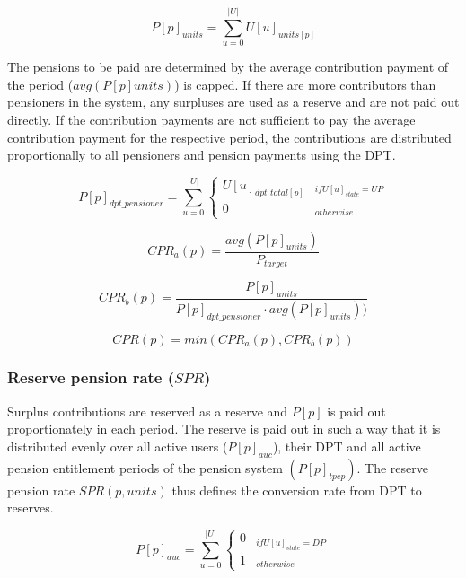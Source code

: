 \begin{equation}
P[p]_{units} = \sum_{u=0}^{|U|} U[u]_{units[p]}
\end{equation}

The pensions to be paid are determined by the average contribution payment of the 
period ($avg(P[p]units)$) is capped. If there are more contributors than pensioners in the system, any surpluses are used as a reserve and are not paid out directly. If the contribution payments are not sufficient to pay the average contribution payment for the respective period, the contributions are distributed proportionally to all pensioners and pension payments using the DPT.

\begin{dmath}
P[p]_{dpt\_pensioner} = 
\sum_{u=0}^{|U|} \begin{cases} 
U[u]_{dpt\_total[p]} & _{if U[u]_{state} = UP}\\
0 & _{otherwise}
\end{cases}
\end{dmath}

\begin{equation*}
CPR_{a}(p) = \frac{avg(P[p]_{units})}{P_{target}}
\end{equation*}

\begin{equation*}
CPR_{b}(p) = \frac{P[p]_{units}} {P[p]_{dpt\_pensioner} \cdot avg(P[p]_{units}))}
\end{equation*}

\begin{equation}
CPR(p) = min(CPR_{a}(p), CPR_{b}(p))
\end{equation}


\subsubsection{Reserve pension rate ($SPR$)}

Surplus contributions are reserved as a reserve and $P[p]$ is paid out proportionately in each period. The reserve is paid out in such a way that it is distributed evenly over all active users ($P[p]_{auc}$), their DPT and all active pension entitlement periods of the pension system $(P[p]_{tpep})$. The reserve pension rate $SPR(p, units)$ thus defines the conversion rate from DPT to reserves.


\begin{equation}
P[p]_{auc} = \sum_{u=0}^{|U|} \begin{cases} 
0 & _{if U[u]_{state} = DP}\\
1 & _{otherwise}
\end{cases}
\end{equation}

